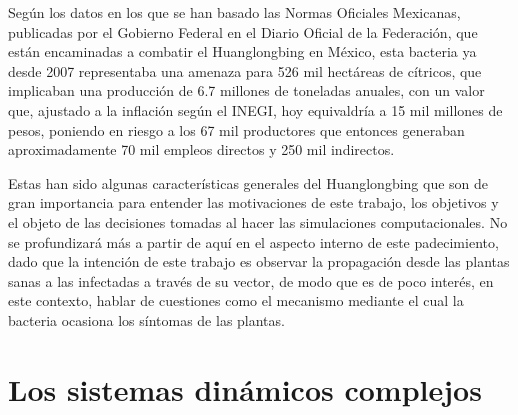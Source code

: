 Según los datos en los que se han basado las Normas Oficiales Mexicanas, publicadas por el Gobierno Federal en el Diario Oficial de la Federación, que están encaminadas a combatir el Huanglongbing en México, esta bacteria ya desde 2007 representaba una amenaza para 526 mil hectáreas de cítricos, que implicaban una producción de 6.7 millones de toneladas anuales, con un valor que, ajustado a la inflación según el INEGI, hoy equivaldría a 15 mil millones de pesos, poniendo en riesgo a los 67 mil productores que entonces generaban aproximadamente 70 mil empleos directos y 250 mil indirectos.

Estas han sido algunas características generales del Huanglongbing que son de gran importancia para entender las motivaciones de este trabajo, los objetivos y el objeto de las decisiones tomadas al hacer las simulaciones computacionales. No se profundizará más a partir de aquí en el aspecto interno de este padecimiento, dado que la intención de este trabajo es observar la propagación desde las plantas sanas a las infectadas a través de su vector, de modo que es de poco interés, en este contexto, hablar de cuestiones como el mecanismo mediante el cual la bacteria ocasiona los síntomas de las plantas.



\section{Los sistemas dinámicos complejos}

